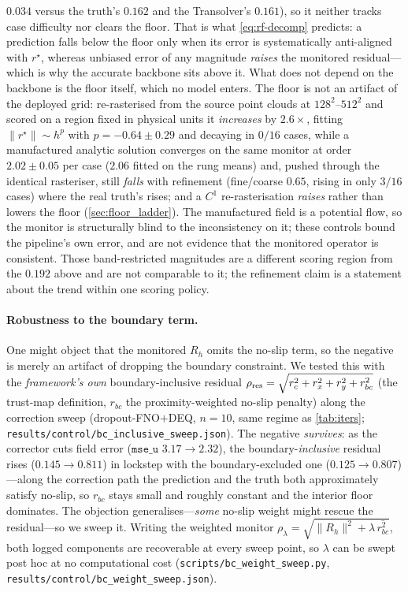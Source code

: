 $0.034$ versus the truth's $0.162$ and the Transolver's $0.161$), so it neither tracks case
difficulty nor clears the floor. That is what \eqref{eq:rf-decomp} predicts: a prediction
falls below the floor only when its error is systematically anti-aligned with $r^\star$,
whereas unbiased error of any magnitude \emph{raises} the monitored residual---which is why
the accurate backbone sits above it. What does not depend
on the backbone is the floor itself, which no model enters. The floor is not an artifact of the
deployed grid: re-rasterised from the source point clouds at $128^2$--$512^2$ and scored on
a region fixed in physical units it \emph{increases} by $2.6\times$, fitting
$\|r^\star\|\sim h^p$ with $p=-0.64\pm0.29$ and decaying in $0/16$ cases, while a
manufactured analytic solution converges on the same monitor at order $2.02\pm0.05$ per
case ($2.06$ fitted on the rung means) and, pushed through the identical rasteriser, still
\emph{falls} with refinement (fine/coarse $0.65$, rising in only $3/16$ cases) where the
real truth's rises; and a $C^1$ re-rasterisation \emph{raises} rather than lowers the floor
(\autoref{sec:floor_ladder}). The manufactured field is a potential flow, so the monitor is
structurally blind to the inconsistency on it; these controls bound the pipeline's own
error, and are not evidence that the monitored operator is consistent. Those band-restricted magnitudes are a different scoring
region from the $0.192$ above and are not comparable to it; the refinement claim is a
statement about the trend within one scoring policy.

\paragraph{Robustness to the boundary term.} One might object that the monitored $R_h$
omits the no-slip term, so the negative is merely an artifact of dropping the boundary
constraint. We tested this with the \emph{framework's own} boundary-inclusive residual
$\rho_{\rm res}=\sqrt{r_c^2+r_x^2+r_y^2+r_{bc}^2}$ (the trust-map definition, $r_{bc}$ the
proximity-weighted no-slip penalty) along the correction sweep (dropout-FNO$+$DEQ, $n{=}10$,
same regime as \autoref{tab:iters}; \texttt{results/control/bc\_inclusive\_sweep.json}). The
negative \emph{survives}: as the corrector cuts field error ($\texttt{mse\_u}$
$3.17\!\to\!2.32$), the boundary-\emph{inclusive} residual rises ($0.145\!\to\!0.811$) in
lockstep with the boundary-excluded one ($0.125\!\to\!0.807$)---along the correction path the
prediction and the truth both approximately satisfy no-slip, so $r_{bc}$ stays small and
roughly constant and the interior floor dominates. The objection generalises---\emph{some}
no-slip weight might rescue the residual---so we sweep it. Writing the weighted monitor
$\rho_\lambda=\sqrt{\|R_h\|^2+\lambda\,\overline{r_{bc}^2}}$, both logged components are
recoverable at every sweep point, so $\lambda$ can be swept post hoc at no computational
cost (\texttt{scripts/bc\_weight\_sweep.py}, \texttt{results/control/bc\_weight\_sweep.json}).

